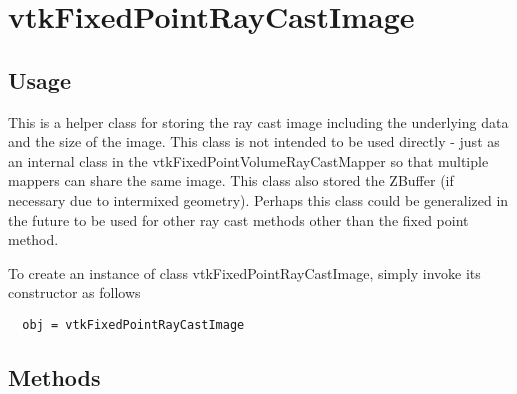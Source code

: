 \section{vtkFixedPointRayCastImage}

\subsection{Usage}

 This is a helper class for storing the ray cast image including the
 underlying data and the size of the image. This class is not intended
 to be used directly - just as an internal class in the 
 vtkFixedPointVolumeRayCastMapper so that multiple mappers can share
 the same image. This class also stored the ZBuffer (if necessary due
 to intermixed geometry). Perhaps this class could be generalized
 in the future to be used for other ray cast methods other than the
 fixed point method.

To create an instance of class vtkFixedPointRayCastImage, simply
invoke its constructor as follows
\begin{verbatim}
  obj = vtkFixedPointRayCastImage
\end{verbatim}
\subsection{Methods}

